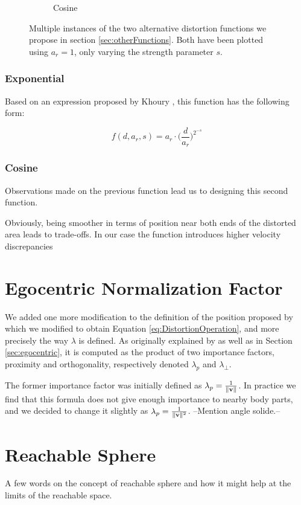 \begin{figure}[h]
\begin{subfigure}[b]{.45\textwidth}
        \caption{Cosine}
        \label{fig:otherDistortionsCos}
    \end{subfigure}
    \caption{Multiple instances of the two alternative distortion functions we propose in section \ref{sec:otherFunctions}. Both have been plotted using $a_r = 1$, only varying the strength parameter $s$.}
    \label{fig:otherDistortions}
\end{figure}

\subsubsection{Exponential}

Based on an expression proposed by Khoury \cite{khoury2015human}, this function has the following form:

\begin{equation*}
    f(d, a_r, s) = a_r \cdot \Bigg(\frac{d}{a_r}\Bigg)^{2^{-s}}
\end{equation*}

\subsubsection{Cosine}

Observations made on the previous function lead us to designing this second function.

Obviously, being smoother in terms of position near both ends of the distorted area leads to trade-offs. In our case the function introduces higher velocity discrepancies 

\section{Egocentric Normalization Factor}

We added one more modification to the definition of the position proposed by \cite{molla2017egocentric} which we modified to obtain Equation \ref{eq:DistortionOperation}, and more precisely the way $\lambda $ is defined. As originally explained by \cite{molla2016precise} as well as in Section \ref{sec:egocentric}, it is computed as the product of two importance factors, proximity and orthogonality, respectively denoted $\lambda_p$ and $\lambda_\perp $.

The former importance factor was initially defined as $\lambda_p = \frac{1}{\lVert\mathbf{v}\rVert}$. In practice we find that this formula does not give enough importance to nearby body parts, and we decided to change it slightly as $\lambda_p = \frac{1}{\lVert\mathbf{v}\rVert^2}$. --Mention angle solide.-- %

\section{Reachable Sphere}

A few words on the concept of reachable sphere and how it might help at the limits of the reachable space.
